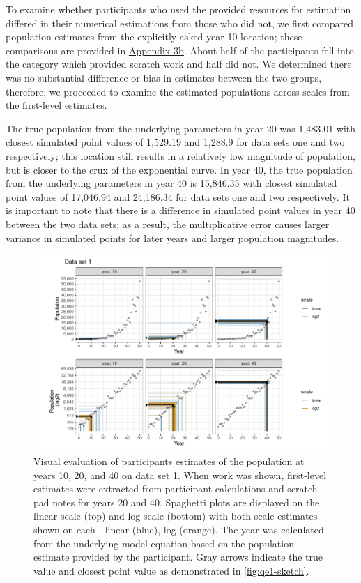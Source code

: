 \documentclass[print]{nuthesis}
\begin{document}
To examine whether participants who used the provided resources for estimation differed in their numerical estimations from those who did not, we first compared population estimates from the explicitly asked year 10 location; these comparisons are provided in \protect\hyperlink{estimation-comparison}{Appendix 3b}.
About half of the participants fell into the category which provided scratch work and half did not.
We determined there was no substantial difference or bias in estimates between the two groups, therefore, we proceeded to examine the estimated populations across scales from the first-level estimates.

The true population from the underlying parameters in year 20 was 1,483.01 with closest simulated point values of 1,529.19 and 1,288.9 for data sets one and two respectively; this location still results in a relatively low magnitude of population, but is closer to the crux of the exponential curve.
In year 40, the true population from the underlying parameters in year 40 is 15,846.35 with closest simulated point values of 17,046.94 and 24,186.34 for data sets one and two respectively.
It is important to note that there is a difference in simulated point values in year 40 between the two data sets; as a result, the multiplicative error causes larger variance in simulated points for later years and larger population magnitudes.

\begin{figure}[tbp]

{\centering \includegraphics[width=1\linewidth,]{thesis_files/figure-latex/spaghetti-dataset1-1} 

}

\caption[Estimated population spaghetti plot: data set 1]{Visual evaluation of participants estimates of the population at years 10, 20, and 40 on data set 1. When work was shown, first-level estimates were extracted from participant calculations and scratch pad notes for years 20 and 40. Spaghetti plots are displayed on the linear scale (top) and log scale (bottom) with both scale estimates shown on each - linear (blue), log (orange). The year was calculated from the underlying model equation based on the population estimate provided by the participant. Gray arrows indicate the true value and closest point value as demonstrated in \cref{fig:qe1-sketch}.}\label{fig:spaghetti-dataset1}
\end{figure}
\end{document}
